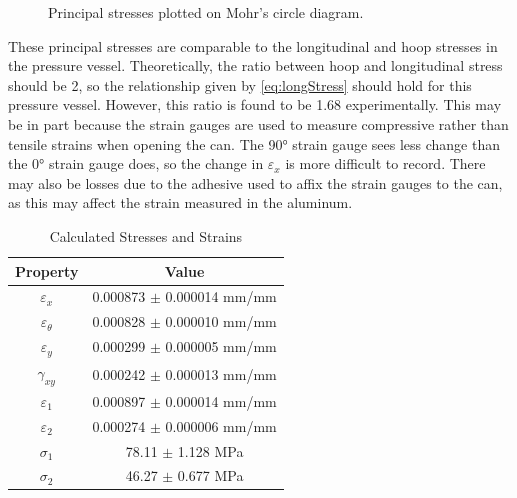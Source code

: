\documentclass[10pt,journal,letterpaper]{IEEEtran}
\begin{document}
\begin{figure}[H]
\centering
{}
\caption{Principal stresses plotted on Mohr’s circle diagram.}
\label{fig:Mohr}
\end{figure}

These principal stresses are comparable to the longitudinal and hoop stresses in the pressure vessel.
Theoretically, the ratio between hoop and longitudinal stress should be 2, so the relationship given by \eqref{eq:longStress} should hold for this pressure vessel.
However, this ratio is found to be 1.68 experimentally.
This may be in part because the strain gauges are used to measure compressive rather than tensile strains when opening the can.
The \ang{90} strain gauge sees less change than the \ang{0} strain gauge does, so the change in $\varepsilon_x$ is more difficult to record.
There may also be losses due to the adhesive used to affix the strain gauges to the can, as this may affect the strain measured in the aluminum.

\begin{table}[H]
\renewcommand\arraystretch{1.25}
\centering
\caption{Calculated Stresses and Strains}
\begin{tabular}{cc}
\hline \hline
Property & Value \\
\hline
$\varepsilon_x$ & 0.000873 $\pm$ 0.000014 mm/mm \\
$\varepsilon_\theta$ & 0.000828 $\pm$ 0.000010 mm/mm \\
$\varepsilon_y$ & 0.000299 $\pm$ 0.000005 mm/mm \\
$\gamma_{xy}$ & 0.000242 $\pm$ 0.000013 mm/mm \\
$\varepsilon_1$ & 0.000897 $\pm$ 0.000014 mm/mm \\
$\varepsilon_2$ & 0.000274 $\pm$ 0.000006 mm/mm \\
$\sigma_1$ & 78.11 $\pm$ 1.128 MPa \\
$\sigma_2$ & 46.27 $\pm$ 0.677 MPa \\
\hline \hline
\end{tabular}
\label{tab:CalcedStr}
\end{table}
\end{document}
